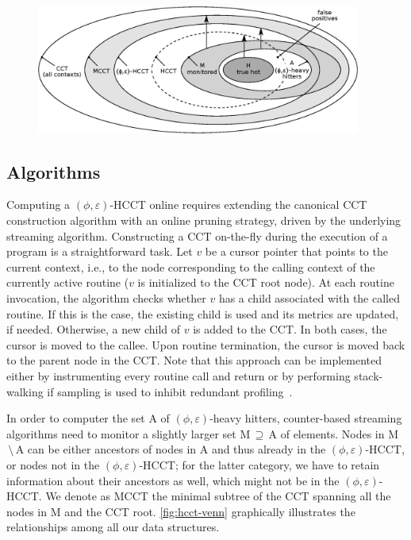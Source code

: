 \ifdefined\noauthorea
\begin{figure}[ht]
\begin{center}
\includegraphics[width=0.95\textwidth]{figures/hcct-venn/hcct-venn.eps}
\caption{\protect}
\end{center}
\end{figure}
\fi

\subsection{Algorithms}
\label{ss:hcct-algorithms}

Computing a $(\phi,\varepsilon)$-HCCT online requires extending the canonical CCT construction algorithm with an online pruning strategy, driven by the underlying streaming algorithm. Constructing a CCT on-the-fly during the execution of a program is a straightforward task. Let $v$ be a cursor pointer that points to the current context, i.e., to the node corresponding to the calling context of the currently active routine ($v$ is initialized to the CCT root node). At each routine invocation, the algorithm checks whether $v$ has a child associated with the called routine. If this is the case, the existing child is used and its metrics are updated, if needed. Otherwise, a new child of $v$ is added to the CCT. In both cases, the cursor is moved to the callee. Upon routine termination, the cursor is moved back to the parent node in the CCT. Note that this approach can be implemented either by instrumenting every routine call and return or by performing stack-walking if sampling is used to inhibit redundant profiling~\cite{Arnold00,Whaley00,Zhuang06}.

In order to computer the set A of $(\phi,\varepsilon)$-heavy hitters, counter-based streaming algorithms need to monitor a slightly larger set M$\,\supseteq\,$A of elements. Nodes in M$\,\setminus\,$A can be either ancestors of nodes in A and thus already in the $(\phi,\varepsilon)$-HCCT, or nodes not in the $(\phi,\varepsilon)$-HCCT; for the latter category, we have to retain information about their ancestors as well, which might not be in the $(\phi,\varepsilon)$-HCCT. We denote as MCCT the minimal subtree of the CCT spanning all the nodes in M and the CCT root. \myfigure\ref{fig:hcct-venn} graphically illustrates the relationships among all our data structures.

